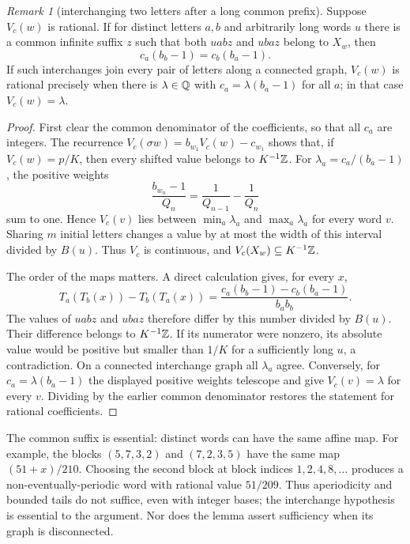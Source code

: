 \documentclass[11pt]{article}
\theoremstyle{remark}
\newtheorem{recordremark}[theorem]{Remark}
\renewenvironment{remark}[1][]{\begin{recordremark}[#1]}{\end{recordremark}}
\theoremstyle{plain}
\begin{document}
\begin{remark}[interchanging two letters after a long common prefix]
\label{long269:lem:late-swap}
Suppose $V_c(w)$ is rational.  If for distinct letters $a,b$ and arbitrarily
long words $u$ there is a common infinite suffix $z$ such that both
$uabz$ and $ubaz$ belong to $X_w$, then
\[
 c_a(b_b-1)=c_b(b_a-1).
\]
If such interchanges join every pair of letters along a connected graph,
$V_c(w)$ is rational precisely when there is $\lambda\in\mathbb{Q}$ with
$c_a=\lambda(b_a-1)$ for all $a$; in that case $V_c(w)=\lambda$.
\end{remark}

\begin{proof}
First clear the common denominator of the coefficients, so that all $c_a$ are
integers.  The recurrence
$V_c(\sigma w)=b_{w_1}V_c(w)-c_{w_1}$ shows that, if
$V_c(w)=p/K$, then every shifted value belongs to $K^{-1}\mathbb{Z}$.
For $\lambda_a=c_a/(b_a-1)$, the positive weights
\[
 \frac{b_{w_n}-1}{Q_n}=\frac1{Q_{n-1}}-\frac1{Q_n}
\]
sum to one.  Hence $V_c(v)$ lies between $\min_a\lambda_a$ and
$\max_a\lambda_a$ for every word $v$.  Sharing $m$ initial letters
changes a value by at most the width of this interval divided by $B(u)$.
Thus $V_c$ is continuous, and $V_c(X_w)\subseteq K^{-1}\mathbb{Z}$.

The order of the maps matters.  A direct calculation gives, for every $x$,
\[
 T_a(T_b(x))-T_b(T_a(x))
  =\frac{c_a(b_b-1)-c_b(b_a-1)}{b_ab_b}.
\]
The values of $uabz$ and $ubaz$ therefore differ by this number divided
by $B(u)$.  Their difference belongs to $K^{-1}\mathbb{Z}$.  If its numerator
were nonzero, its absolute value would be positive but smaller than $1/K$
for a sufficiently long $u$, a contradiction.  On a connected interchange
graph all $\lambda_a$ agree.  Conversely, for
$c_a=\lambda(b_a-1)$ the displayed positive weights telescope and give
$V_c(v)=\lambda$ for every $v$.  Dividing by the earlier common denominator restores the statement for rational coefficients.
\end{proof}

The common suffix is essential: distinct words can have the same affine
map.  For example, the blocks $(5,7,3,2)$ and $(7,2,3,5)$ have the same
map $(51+x)/210$.  Choosing the second block at block indices
$1,2,4,8,\ldots$ produces a non-eventually-periodic word with rational
value $51/209$.  Thus aperiodicity and bounded tails do not suffice, even with integer
bases; the interchange hypothesis is essential to the argument.  Nor does the lemma
assert sufficiency when its graph is disconnected.
\end{document}
